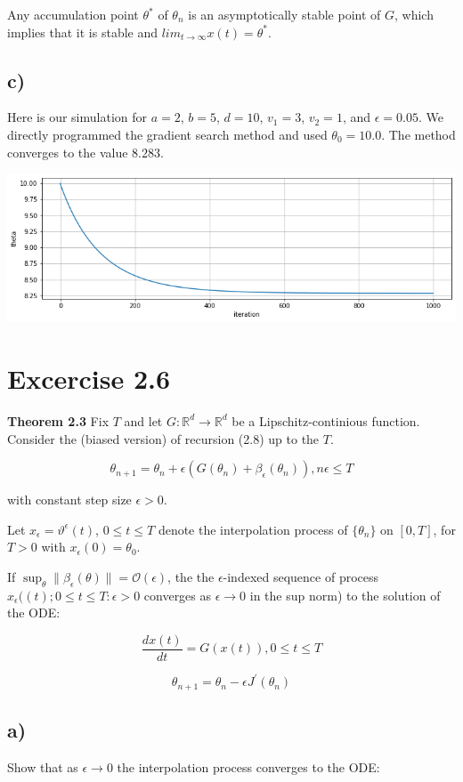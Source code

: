 \documentclass{article}
\begin{document}
Any accumulation point $\theta^{*}$ of $\theta_{n}$ is an asymptotically stable point of $G$, which implies that it is stable and $lim_{t\rightarrow\infty}x(t)=\theta^{*}$.

\subsection{c)}

Here is our simulation for $a=2$, $b=5$, $d=10$, $v_{1}=3$, $v_{2}=1$, and $\epsilon=0.05$. We directly programmed the gradient search method and used $\theta_{0}=10.0$. The method converges to the value $8.283$.

\includegraphics[width=0.9\linewidth]{index.png}

\section{Excercise 2.6}

\textbf{Theorem 2.3} Fix $T$ and let $G:\mathbb{R}^{d}\rightarrow\mathbb{R}^{d}$ be a Lipschitz-continious function. Consider the (biased version) of recursion (2.8) up to the $T$.

$$\theta_{n+1}=\theta_{n} + \epsilon(G(\theta_{n}) + \beta_{\epsilon}(\theta_{n})), n\epsilon\leq T$$

with constant step size $\epsilon > 0$. 

Let $x_{\epsilon}=\vartheta^{\epsilon}(t)$, $0 \leq t \leq T$ denote the interpolation process of $\{\theta_{n}\}$ on $[0, T]$, for $T>0$ with $x_{\epsilon}(0)=\theta_{0}$.

If $\sup_{\theta}\lVert\beta_{\epsilon}(\theta)\rVert=\mathcal{O}(\epsilon)$, the the $\epsilon$-indexed sequence of process ${x_{\epsilon}((t); 0 \leq t \leq T: \epsilon > 0}$ converges as $\epsilon \rightarrow 0$ in the sup norm) to the solution of the ODE:

$$\frac{dx(t)}{dt} = G(x(t)), 0\leq t \leq T$$

$$\theta_{n+1} = \theta_{n} - \epsilon J^{'}(\theta_{n})$$

\subsection{a)}
Show that as $\epsilon\rightarrow 0$ the interpolation process converges to the ODE:
\end{document}
